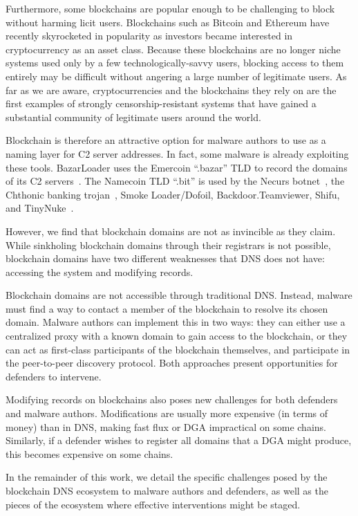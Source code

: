 \documentclass[10pt,sigconf,letterpaper]{acmart}
\begin{document}
Furthermore, some blockchains are popular enough to be challenging to block without 
harming licit users. Blockchains such as Bitcoin and Ethereum have recently 
skyrocketed in popularity as investors became interested in cryptocurrency as 
an asset class. Because these blockchains are no longer niche systems used only by a few 
technologically-savvy users, blocking access 
to them entirely may be difficult without angering a large number of 
legitimate users. As far as we are aware, cryptocurrencies and the blockchains 
they rely on are the first examples of strongly censorship-resistant systems 
that have gained a substantial community of legitimate users around the world.

Blockchain is therefore an attractive option for malware authors to use as a naming 
layer for C2 server addresses. In fact, some malware is already exploiting these tools.
BazarLoader uses the Emercoin ``.bazar'' TLD to record the domains of its C2 
servers~\cite{brandt_bazarloader_2021}. The Namecoin TLD 
``.bit'' is used by the
Necurs botnet~\cite{dgas_of_necurs}, the Chthonic banking 
trojan~\cite{malware_traffic_analysis_2016}, Smoke Loader/Dofoil, Backdoor.Teamviewer, Shifu, 
and TinyNuke~\cite{abusech_2017, mackie_cryptodns_2018}.

However, we find that blockchain domains are not as invincible as they claim. While sinkholing 
blockchain domains through their registrars is not possible, blockchain domains have two different 
weaknesses that DNS does not have: accessing the system and modifying records.

 Blockchain domains are not accessible through traditional DNS. Instead, malware 
must find a way to contact a member of the blockchain to resolve its chosen domain. Malware authors 
can implement this in two ways: they can either use a centralized proxy with a known domain to gain 
access to the blockchain, or they can act as first-class participants of the blockchain themselves, 
and participate in the peer-to-peer discovery protocol. Both approaches present opportunities for 
defenders to intervene. 

Modifying records on blockchains also poses new challenges for both defenders and malware authors. 
Modifications are usually more expensive (in terms of money) than in DNS, making fast flux or DGA 
impractical on some chains. Similarly, if a defender wishes to register all domains that a DGA 
might produce, this becomes expensive on some chains.

In the remainder of this work, we detail the specific challenges posed by the blockchain DNS 
ecosystem to malware authors and defenders, as well as the pieces of the ecosystem where 
effective interventions might be staged.
\end{document}
